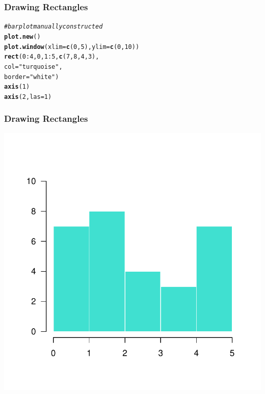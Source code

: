 \documentclass[12pt]{beamer}\usepackage[]{graphicx}\usepackage[]{color}
\makeatletter
\newcommand{\hlnum}[1]{\textcolor[rgb]{0.686,0.059,0.569}{#1}}%
\newcommand{\hlstr}[1]{\textcolor[rgb]{0.192,0.494,0.8}{#1}}%
\newcommand{\hlcom}[1]{\textcolor[rgb]{0.678,0.584,0.686}{\textit{#1}}}%
\newcommand{\hlopt}[1]{\textcolor[rgb]{0,0,0}{#1}}%
\newcommand{\hlstd}[1]{\textcolor[rgb]{0.345,0.345,0.345}{#1}}%
\newcommand{\hlkwc}[1]{\textcolor[rgb]{0.333,0.667,0.333}{#1}}%
\newcommand{\hlkwd}[1]{\textcolor[rgb]{0.737,0.353,0.396}{\textbf{#1}}}%
\newenvironment{kframe}{%
 \def\at@end@of@kframe{}%
 \ifinner\ifhmode%
  \def\at@end@of@kframe{\end{minipage}}%
  \begin{minipage}{\columnwidth}%
 \fi\fi%
 \def\FrameCommand##1{\hskip\@totalleftmargin \hskip-\fboxsep
 \colorbox{shadecolor}{##1}\hskip-\fboxsep
     \hskip-\linewidth \hskip-\@totalleftmargin \hskip\columnwidth}%
 \MakeFramed {\advance\hsize-\width
   \@totalleftmargin\z@ \linewidth\hsize
   \@setminipage}}%
 {\par\unskip\endMakeFramed%
 \at@end@of@kframe}
\newenvironment{knitrout}{}{} %
\makeatother
\begin{document}
\begin{frame}[fragile]
\frametitle{Drawing Rectangles}
\begin{knitrout}\footnotesize
{}\color{fgcolor}\begin{kframe}
\begin{alltt}
\hlcom{# barplot manually constructed}
\hlkwd{plot.new}\hlstd{()}
\hlkwd{plot.window}\hlstd{(}\hlkwc{xlim} \hlstd{=} \hlkwd{c}\hlstd{(}\hlnum{0}\hlstd{,} \hlnum{5}\hlstd{),} \hlkwc{ylim} \hlstd{=} \hlkwd{c}\hlstd{(}\hlnum{0}\hlstd{,} \hlnum{10}\hlstd{))}
\hlkwd{rect}\hlstd{(}\hlnum{0}\hlopt{:}\hlnum{4}\hlstd{,} \hlnum{0}\hlstd{,} \hlnum{1}\hlopt{:}\hlnum{5}\hlstd{,} \hlkwd{c}\hlstd{(}\hlnum{7}\hlstd{,} \hlnum{8}\hlstd{,} \hlnum{4}\hlstd{,} \hlnum{3}\hlstd{),}
     \hlkwc{col} \hlstd{=} \hlstr{"turquoise"}\hlstd{,}
     \hlkwc{border} \hlstd{=} \hlstr{"white"}\hlstd{)}
\hlkwd{axis}\hlstd{(}\hlnum{1}\hlstd{)}
\hlkwd{axis}\hlstd{(}\hlnum{2}\hlstd{,} \hlkwc{las} \hlstd{=} \hlnum{1}\hlstd{)}
\end{alltt}
\end{kframe}
\end{knitrout}
\end{frame}


\begin{frame}[fragile]
\frametitle{Drawing Rectangles}
\begin{knitrout}\scriptsize
{}\color{fgcolor}

{\centering \includegraphics[width=.8\linewidth,height=.8\linewidth]{figure/rectangles-1} 

}



\end{knitrout}
\end{frame}
\end{document}
